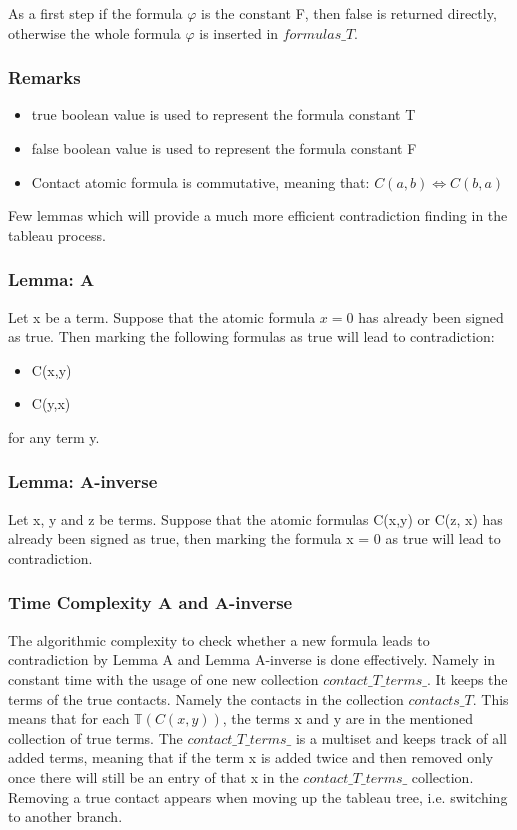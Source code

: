 \documentclass{article}
\begin{document}
	As a first step if the formula $\varphi$ is the constant F, then false is returned directly, otherwise the whole formula $\varphi$ is inserted in $formulas\_T$.
	\newline
	\subsubsection*{Remarks}
	\begin{itemize}
		\item true boolean value is used to represent the formula constant T
		\item false boolean value is used to represent the formula constant F
		\item Contact atomic formula is commutative, meaning that: $C(a,b) \iff C(b,a)$
	\end{itemize}

	Few lemmas which will provide a much more efficient contradiction finding in the tableau process.
	\subsubsection*{Lemma: A}
	Let x be a term. Suppose that the atomic formula $x = 0$ has already been signed as true.
	Then marking the following formulas as true will lead to contradiction:
	\begin{itemize}
		\item C(x,y)
		\item C(y,x)
	\end{itemize}
	for any term y.

	\subsubsection*{Lemma: A-inverse}
	Let x, y and z be terms. Suppose that the atomic formulas C(x,y) or C(z, x) has already been signed as true, then marking the formula x = 0 as true will lead to contradiction.
	\newline
	\subsubsection*{Time Complexity A and A-inverse}
	The algorithmic complexity to check whether a new formula leads to contradiction by Lemma A and Lemma A-inverse is done effectively. Namely in constant time with the usage of one new collection $contact\_T\_terms\_$. It keeps the terms of the true contacts. Namely the contacts in the collection $contacts\_T$. This means that for each $\mathbb{T}(C(x, y))$, the terms x and y are in the mentioned collection of true terms. The $contact\_T\_terms\_$  is a multiset and keeps track of all added terms, meaning that if the term x is added twice and then removed only once there will still be an entry of that x in the $contact\_T\_terms\_$ collection. Removing a true contact appears when moving up the tableau tree, i.e. switching to another branch.
\end{document}
